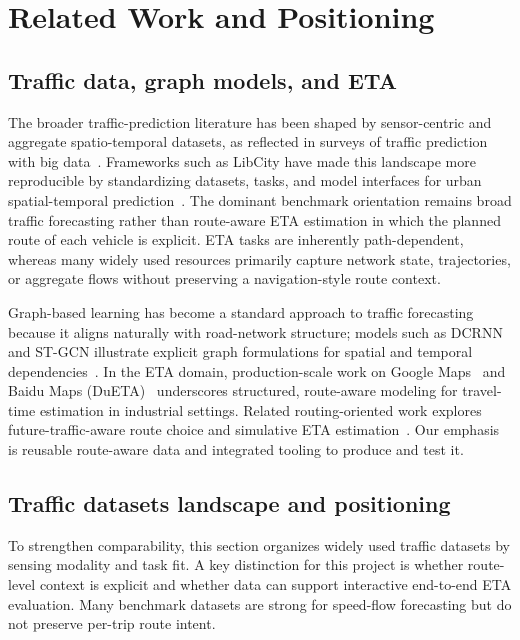 \chapter{Related Work and Positioning}\label{sec:related}

\section{Traffic data, graph models, and ETA}
The broader traffic-prediction literature has been shaped by sensor-centric and aggregate spatio-temporal datasets, as reflected in surveys of traffic prediction with big data~\cite{yu2017trafficpred}. Frameworks such as LibCity have made this landscape more reproducible by standardizing datasets, tasks, and model interfaces for urban spatial-temporal prediction~\cite{libcity2021}. The dominant benchmark orientation remains broad traffic forecasting rather than route-aware ETA estimation in which the planned route of each vehicle is explicit. ETA tasks are inherently path-dependent, whereas many widely used resources primarily capture network state, trajectories, or aggregate flows without preserving a navigation-style route context.

Graph-based learning has become a standard approach to traffic forecasting because it aligns naturally with road-network structure; models such as DCRNN and ST-GCN illustrate explicit graph formulations for spatial and temporal dependencies~\cite{dcrnn2018,stgcn2018}. In the ETA domain, production-scale work on Google Maps~\cite{googlemapseta2021} and Baidu Maps (DuETA)~\cite{dueta2022} underscores structured, route-aware modeling for travel-time estimation in industrial settings. Related routing-oriented work explores future-traffic-aware route choice and simulative ETA estimation~\cite{voloch2021,voloch2025}. Our emphasis is reusable route-aware data and integrated tooling to produce and test it.


\section{Traffic datasets landscape and positioning}
To strengthen comparability, this section organizes widely used traffic datasets by sensing modality and task fit. A key distinction for this project is whether route-level context is explicit and whether data can support interactive end-to-end ETA evaluation. Many benchmark datasets are strong for speed-flow forecasting but do not preserve per-trip route intent.

